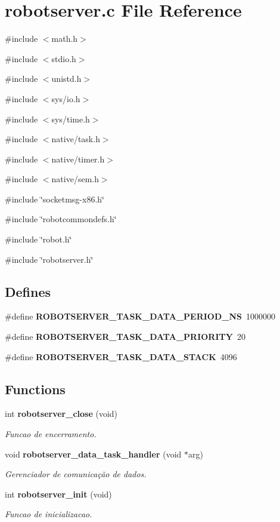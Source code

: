 \section{robotserver.c File Reference}
\label{robotserver_8c}
{\ttfamily \#include $<$math.h$>$}\par
{\ttfamily \#include $<$stdio.h$>$}\par
{\ttfamily \#include $<$unistd.h$>$}\par
{\ttfamily \#include $<$sys/io.h$>$}\par
{\ttfamily \#include $<$sys/time.h$>$}\par
{\ttfamily \#include $<$native/task.h$>$}\par
{\ttfamily \#include $<$native/timer.h$>$}\par
{\ttfamily \#include $<$native/sem.h$>$}\par
{\ttfamily \#include \char`\"{}socketmsg-\/x86.h\char`\"{}}\par
{\ttfamily \#include \char`\"{}robotcommondefs.h\char`\"{}}\par
{\ttfamily \#include \char`\"{}robot.h\char`\"{}}\par
{\ttfamily \#include \char`\"{}robotserver.h\char`\"{}}\par
\subsection*{Defines}
\begin{DoxyCompactItemize}
\item 
\#define {\bf ROBOTSERVER\_\-TASK\_\-DATA\_\-PERIOD\_\-NS}~1000000
\item 
\#define {\bf ROBOTSERVER\_\-TASK\_\-DATA\_\-PRIORITY}~20
\item 
\#define {\bf ROBOTSERVER\_\-TASK\_\-DATA\_\-STACK}~4096
\end{DoxyCompactItemize}
\subsection*{Functions}
\begin{DoxyCompactItemize}
\item 
int {\bf robotserver\_\-close} (void)
\begin{DoxyCompactList}\small\item\em Funcao de encerramento. \item\end{DoxyCompactList}\item 
void {\bf robotserver\_\-data\_\-task\_\-handler} (void $\ast$arg)
\begin{DoxyCompactList}\small\item\em Gerenciador de comunicação de dados. \item\end{DoxyCompactList}\item 
int {\bf robotserver\_\-init} (void)
\begin{DoxyCompactList}\small\item\em Funcao de inicializacao. \item\end{DoxyCompactList}\end{DoxyCompactItemize}
